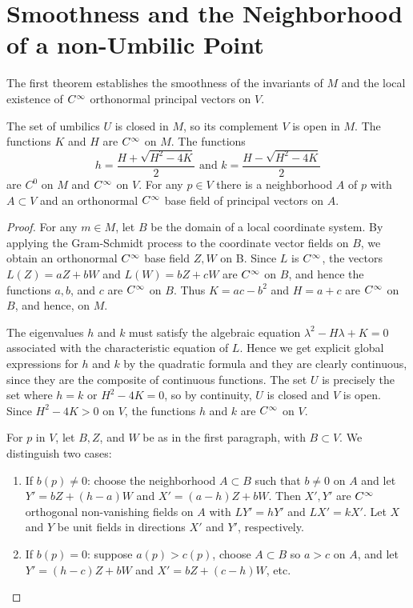 \documentclass[../main]{subfiles}
\begin{document}
\section{Smoothness and the Neighborhood of a non-Umbilic Point}\label{ch03:s1}


The first theorem establishes the smoothness of the invariants of $M$ and the local existence of $C^\infty$ orthonormal principal vectors on $V$.



\begin{theorem} \label{thm:ch3.1.1}
 The set of umbilics $U$ is closed in $M$, so its complement $V$ is open in $M$. The functions $K$ and $H$ are $C^\infty$ on $M$. The functions \[h=\dfrac{H+\sqrt{H^{2}-4 K}}{2} \text{ and } k=\dfrac{H-\sqrt{H^{2}-4 K}}{2}\] are $C^{0}$ on $M$ and $C^\infty$ on $V$. For any $p \in V$ there is a neighborhood $A$ of $p$ with $A \subset V$ and an orthonormal $C^\infty$ base field of principal vectors on $A .$
\end{theorem}

\begin{proof}

 For any $m\in M$, let $B$ be the domain of a local coordinate system. By applying the Gram-Schmidt process to the coordinate vector fields on $B$, we obtain an orthonormal $C^\infty$ base field $Z, W$ on B. Since $L$ is $C^\infty$, the vectors $L(Z)=a Z+b W$ and $L(W)=b Z+c W$ are $C^\infty$ on $B$, and hence the functions $a, b$, and $c$ are $C^\infty$ on $B$. Thus $K=a c-b^{2}$ and $H=a+c$ are $C^\infty$ on $B$, and hence, on $M$.
 
 The eigenvalues $h$ and $k$ must satisfy the algebraic equation $\lambda^{2}-H \lambda+K=0$ associated with the characteristic equation of $L$. Hence we get explicit global expressions for $h$ and $k$ by the quadratic formula and they are clearly continuous, since they are the composite of continuous functions. The set $U$ is precisely the set where $h=k$ or $H^{2}-4 K=0$, so by continuity, $U$ is closed and $V$ is open. Since $H^{2}-4 K>0$ on $V$, the functions $h$ and $k$ are $C^\infty$ on $V$.

For $p$ in $V$, let $B, Z$, and $W$ be as in the first paragraph, with $B \subset V .$ We distinguish two cases: 
\begin{enumerate}
    \item If $b(p) \neq 0$: choose the neighborhood $A \subset B$ such that $b \neq 0$ on $A$ and let $Y'=b Z+(h-a) W$ and $X'=(a-h) Z+b W$. Then $X', Y'$ are $C^\infty$ orthogonal non-vanishing fields on $A$ with $L Y'=h Y'$ and $L X'=kX'$. Let $X$ and $Y$ be unit fields in directions $X'$ and $Y'$, respectively.
    \item If $b(p)=0$: suppose $a(p)>c(p)$, choose $A \subset B$ so $a>c$ on $A$, and let $Y'=(h-c) Z+b W$ and $X'=b Z+(c-h) W$, etc.
\end{enumerate}

\end{proof}
\end{document}
